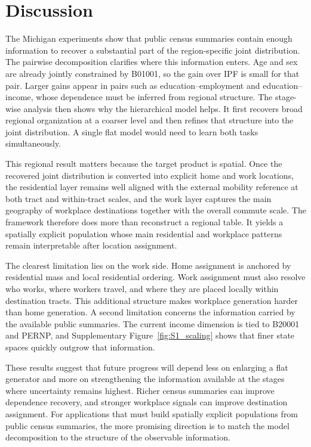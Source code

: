 \documentclass[11pt]{article}
\begin{document}
\FloatBarrier


\section{Discussion}

The Michigan experiments show that public census summaries contain enough information to recover a substantial part of the region-specific joint distribution. The pairwise decomposition clarifies where this information enters. Age and sex are already jointly constrained by B01001, so the gain over IPF is small for that pair. Larger gains appear in pairs such as education--employment and education--income, whose dependence must be inferred from regional structure. The stage-wise analysis then shows why the hierarchical model helps. It first recovers broad regional organization at a coarser level and then refines that structure into the joint distribution. A single flat model would need to learn both tasks simultaneously.

This regional result matters because the target product is spatial. Once the recovered joint distribution is converted into explicit home and work locations, the residential layer remains well aligned with the external mobility reference at both tract and within-tract scales, and the work layer captures the main geography of workplace destinations together with the overall commute scale. The framework therefore does more than reconstruct a regional table. It yields a spatially explicit population whose main residential and workplace patterns remain interpretable after location assignment.

The clearest limitation lies on the work side. Home assignment is anchored by residential mass and local residential ordering. Work assignment must also resolve who works, where workers travel, and where they are placed locally within destination tracts. This additional structure makes workplace generation harder than home generation. A second limitation concerns the information carried by the available public summaries. The current income dimension is tied to B20001 and PERNP, and Supplementary Figure~\ref{fig:S1_scaling} shows that finer state spaces quickly outgrow that information.

These results suggest that future progress will depend less on enlarging a flat generator and more on strengthening the information available at the stages where uncertainty remains highest. Richer census summaries can improve dependence recovery, and stronger workplace signals can improve destination assignment. For applications that must build spatially explicit populations from public census summaries, the more promising direction is to match the model decomposition to the structure of the observable information.
\end{document}
